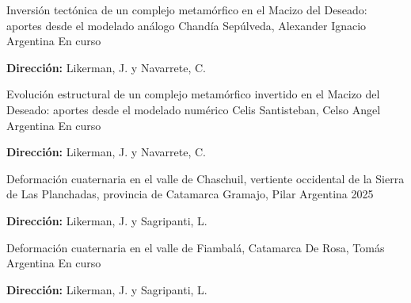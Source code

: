 \begin{cventries}


\cventry
    {Inversión tectónica de un complejo metamórfico en el Macizo del Deseado: aportes desde el modelado análogo}
    {Chandía Sepúlveda, Alexander Ignacio}
    {Argentina} %
    {En curso} %
    {
      \begin{cvitems} %
        \item {\textbf{Dirección:} Likerman, J. y Navarrete, C.}
      \end{cvitems}
    }


\cventry
    {Evolución estructural de un complejo metamórfico invertido en el Macizo del Deseado: aportes desde el modelado numérico}
    {Celis Santisteban, Celso Angel}
    {Argentina} %
    {En curso} %
    {
      \begin{cvitems} %
        \item {\textbf{Dirección:} Likerman, J. y Navarrete, C.}
      \end{cvitems}
    }

\cventry
    {Deformación cuaternaria en el valle de Chaschuil, vertiente occidental de la Sierra de Las Planchadas, provincia de Catamarca}
    {Gramajo, Pilar}
    {Argentina} %
    {2025} %
    {
      \begin{cvitems} %
        \item {\textbf{Dirección:} Likerman, J. y Sagripanti, L.}
      \end{cvitems}
    }

\cventry
    {Deformación cuaternaria en el valle de Fiambalá, Catamarca}
    {De Rosa, Tomás}
    {Argentina} %
    {En curso} %
    {
      \begin{cvitems} %
        \item {\textbf{Dirección:} Likerman, J. y Sagripanti, L.}
      \end{cvitems}
    }



\end{cventries}
